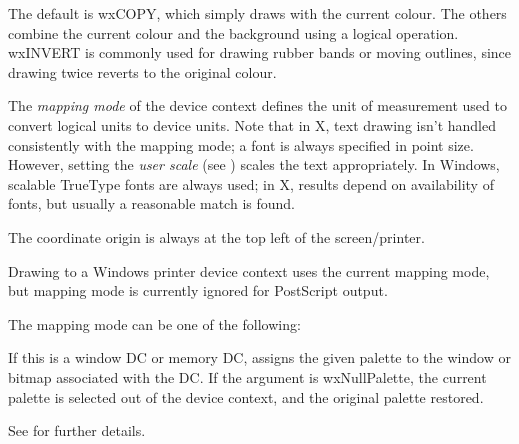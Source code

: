 The default is wxCOPY, which simply draws with the current colour.
The others combine the current colour and the background using a
logical operation.  wxINVERT is commonly used for drawing rubber bands or
moving outlines, since drawing twice reverts to the original colour.


\label{wxdcsetmapmode}


The {\it mapping mode} of the device context defines the unit of
measurement used to convert logical units to device units. Note that
in X, text drawing isn't handled consistently with the mapping mode; a
font is always specified in point size. However, setting the {\it
user scale} (see ) scales the text appropriately. In
Windows, scalable TrueType fonts are always used; in X, results depend
on availability of fonts, but usually a reasonable match is found.

The coordinate origin is always at the top left of the screen/printer.

Drawing to a Windows printer device context uses the current mapping mode,
but mapping mode is currently ignored for PostScript output.

The mapping mode can be one of the following:

\begin{twocollist}\itemsep=0pt
\end{twocollist}


\label{wxdcsetpalette}


If this is a window DC or memory DC, assigns the given palette to the window
or bitmap associated with the DC. If the argument is wxNullPalette, the current
palette is selected out of the device context, and the original palette
restored.

See  for further details. 


\label{wxdcsetpen}



